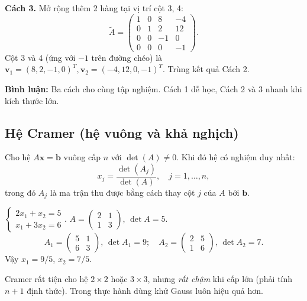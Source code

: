 \documentclass[12pt,a4paper]{article}
\begin{document}
\begin{vidu}[title={Ba cách tìm nghiệm trên cùng một bài toán}]
\medskip
\textbf{Cách 3.} Mở rộng thêm 2 hàng tại vị trí cột 3, 4:
\[
  \widetilde{A} = \begin{pmatrix}1&0&8&-4\\0&1&2&12\\0&0&-1&0\\0&0&0&-1\end{pmatrix}.
\]
Cột 3 và 4 (ứng với $-1$ trên đường chéo) là $\mathbf{v}_1 = (8,2,-1,0)^T, \mathbf{v}_2=(-4,12,0,-1)^T$. Trùng kết quả Cách 2.

\medskip
\textbf{Bình luận:} Ba cách cho cùng tập nghiệm. Cách 1 dễ học, Cách 2 và 3 nhanh khi kích thước lớn.
\end{vidu}

\subsection{Hệ Cramer (hệ vuông và khả nghịch)}

\begin{dinhly}[title={Quy tắc Cramer}]
Cho hệ $A\mathbf{x} = \mathbf{b}$ vuông cấp $n$ với $\det(A) \ne 0$. Khi đó hệ có nghiệm duy nhất:
\[
  x_j = \dfrac{\det(A_j)}{\det(A)},\quad j = 1, \ldots, n,
\]
trong đó $A_j$ là ma trận thu được bằng cách thay cột $j$ của $A$ bởi $\mathbf{b}$.
\end{dinhly}

\begin{vidu}
$\begin{cases}2x_1 + x_2 = 5\\ x_1 + 3x_2 = 6\end{cases}$. $A = \begin{pmatrix}2 & 1\\1 & 3\end{pmatrix}$, $\det A = 5$.
\[
  A_1 = \begin{pmatrix}5 & 1\\6 & 3\end{pmatrix},\, \det A_1 = 9; \quad A_2 = \begin{pmatrix}2 & 5\\1 & 6\end{pmatrix},\,\det A_2 = 7.
\]
Vậy $x_1 = 9/5$, $x_2 = 7/5$.
\end{vidu}

\begin{luuy}
Cramer rất tiện cho hệ $2\times 2$ hoặc $3\times 3$, nhưng \emph{rất chậm} khi cấp lớn (phải tính $n+1$ định thức). Trong thực hành dùng khử Gauss luôn hiệu quả hơn.
\end{luuy}
\end{document}
